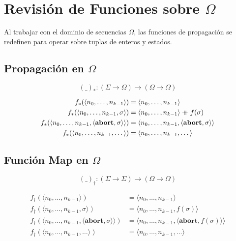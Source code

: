 \documentclass[a4paper,11pt]{article}
\begin{document}
\section{Revisión de Funciones sobre $\Omega$}

Al trabajar con el dominio de secuencias $\Omega$, las funciones de propagación se redefinen para operar sobre tuplas de enteros y estados.

\subsection{Propagación en $\Omega$}

\[
(\_)_{*} : (\Sigma \to \Omega) \to (\Omega \to \Omega)
\]

\[
\begin{aligned}
f_{*}(\langle n_0, \dots, n_{k-1} \rangle) &= \langle n_0, \dots, n_{k-1} \rangle \\
f_{*}(\langle n_0, \dots, n_{k-1}, \sigma \rangle) &= \langle n_0, \dots, n_{k-1} \rangle \mathbin{+\mkern-10mu+} f(\sigma) \\
f_{*}(\langle n_0, \dots, n_{k-1}, \langle \mathbf{abort}, \sigma \rangle \rangle) &= \langle n_0, \dots, n_{k-1}, \langle \mathbf{abort}, \sigma \rangle \rangle \\
f_{*}(\langle n_0, \dots, n_{k-1}, \dots \rangle) &= \langle n_0, \dots, n_{k-1}, \dots \rangle
\end{aligned}
\]

\subsection{Función Map en $\Omega$}

\[
(\_)_{\dagger} : (\Sigma \to \Sigma) \to (\Omega \to \Omega)
\]

\[
\begin{aligned}
f_{\dagger}(\langle n_0, \dots, n_{k-1} \rangle) &= \langle n_0, \dots, n_{k-1} \rangle \\
f_{\dagger}(\langle n_0, \dots, n_{k-1}, \sigma \rangle) &= \langle n_0, \dots, n_{k-1}, f(\sigma) \rangle \\
f_{\dagger}(\langle n_0, \dots, n_{k-1}, \langle \mathbf{abort}, \sigma \rangle \rangle) &= \langle n_0, \dots, n_{k-1}, \langle \mathbf{abort}, f(\sigma) \rangle \rangle \\
f_{\dagger}(\langle n_0, \dots, n_{k-1}, \dots \rangle) &= \langle n_0, \dots, n_{k-1}, \dots \rangle
\end{aligned}
\]
\end{document}
